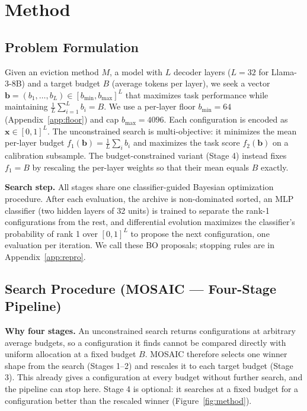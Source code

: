 \documentclass[11pt]{article}
\begin{document}
\section{Method}
\label{sec:method}

\subsection{Problem Formulation}

Given an eviction method $M$, a model with $L$ decoder layers ($L = 32$ for Llama-3-8B) and a target budget $B$ (average tokens per layer), we seek a vector $\mathbf{b} = (b_1, \ldots, b_L) \in [b_{\min}, b_{\max}]^L$ that maximizes task performance while maintaining $\frac{1}{L}\sum_{i=1}^{L} b_i = B$. We use a per-layer floor $b_{\min} = 64$ (Appendix~\ref{app:floor}) and cap $b_{\max} = 4096$. Each configuration is encoded as $\mathbf{x} \in [0,1]^L$. The unconstrained search is multi-objective: it minimizes the mean per-layer budget $f_1(\mathbf{b}) = \frac{1}{L}\sum_i b_i$ and maximizes the task score $f_2(\mathbf{b})$ on a calibration subsample. The budget-constrained variant (Stage 4) instead fixes $f_1 = B$ by rescaling the per-layer weights so that their mean equals $B$ exactly.

\textbf{Search step.} All stages share one classifier-guided Bayesian optimization procedure. After each evaluation, the archive is non-dominated sorted, an MLP classifier (two hidden layers of 32 units) is trained to separate the rank-1 configurations from the rest, and differential evolution maximizes the classifier's probability of rank 1 over $[0,1]^L$ to propose the next configuration, one evaluation per iteration. We call these BO proposals; stopping rules are in Appendix~\ref{app:repro}.

\subsection{Search Procedure (MOSAIC — Four-Stage Pipeline)}

\textbf{Why four stages.} An unconstrained search returns configurations at arbitrary average budgets, so a configuration it finds cannot be compared directly with uniform allocation at a fixed budget $B$. MOSAIC therefore selects one winner shape from the search (Stages 1--2) and rescales it to each target budget (Stage 3). This already gives a configuration at every budget without further search, and the pipeline can stop here. Stage 4 is optional: it searches at a fixed budget for a configuration better than the rescaled winner (Figure~\ref{fig:method}).
\end{document}
